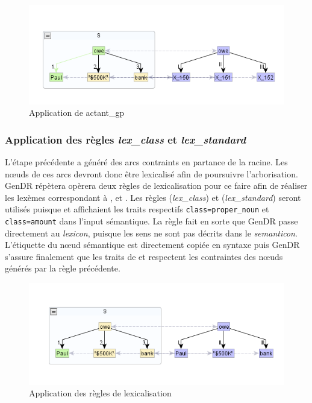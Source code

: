 \begin{figure}[htb]
	\centering
	\includegraphics[width=1\textwidth, trim = {0cm 8mm 0cm 15mm},clip]{ch3/figs/actant_gp1.png}
	\caption{Application de actant\_gp}
	\label{fig:actantgp}
\end{figure}

\subsubsection{Application des règles \emph{lex\_class} et \emph{lex\_standard}}

L'étape précédente a généré des arcs contraints en partance de la racine. Les n\oe{}uds de ces arcs devront donc être lexicalisé afin de poursuivre l'arborisation. GenDR répètera opèrera deux règles de lexicalisation pour ce faire afin de réaliser les lexèmes correspondant à ,  et . Les règles (\emph{lex\_class}) et (\emph{lex\_standard}) seront utilisés puisque  et  affichaient les traits respectifs \texttt{class=proper\_noun} et \texttt{class=amount} dans l'input sémantique. La règle fait en sorte que GenDR passe directement au \emph{lexicon}, puisque les sens ne sont pas décrits dans le \emph{semanticon}. L'étiquette du n\oe{}ud sémantique est directement copiée en syntaxe puis GenDR s'assure finalement que les traits de  et  respectent les contraintes des n\oe{}uds générés par la règle précédente.

\begin{figure}[htb]
	\centering
	\includegraphics[width=1\textwidth, trim = {0cm 8mm 0cm 10mm},clip]{ch3/figs/lex_standard2.png}
	\caption{Application des règles de lexicalisation}
	\label{fig:lexstand2}
\end{figure}

